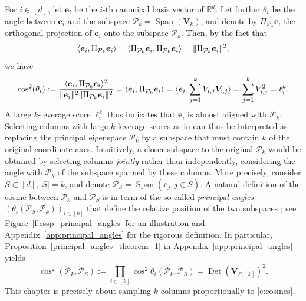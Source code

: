 \documentclass[twoside,11pt]{book}
\newcommand{\rev}[1]{\textcolor{black}{#1}}
\numberwithin{theorem}{chapter}
\numberwithin{definition}{chapter}
\numberwithin{proposition}{chapter}
\numberwithin{corollary}{chapter}
\numberwithin{example}{chapter}
\numberwithin{lemma}{chapter}
\numberwithin{assumption}{chapter}
\numberwithin{equation}{chapter}
\numberwithin{figure}{chapter}
\DeclareMathOperator{\Det}{Det}
\DeclareMathOperator{\Span}{\mathrm{Span}}
\begin{document}
For $i \in [d]$, let $\bm{e}_{i}$ be the $i$-th canonical basis vector of $\mathbb{R}^{d}$. Let further $\theta_{i}$ be the angle between $\bm{e}_{i}$ and the subspace $\mathcal{P}_{k} = \Span(\bm{V}_{k})$, and denote by $\Pi_{\mathcal{P}_{k}}\bm{e}_{i}$ the orthogonal projection of $\bm{e}_{i}$ onto the subspace $\mathcal{P}_{k}$. Then, \rev{by the fact that}
\begin{equation}
\rev{\langle \bm{e}_{i},\Pi_{\mathcal{P}_{k}}\bm{e}_{i} \rangle = \langle \Pi_{\mathcal{P}_{k}}\bm{e}_{i},\Pi_{\mathcal{P}_{k}}\bm{e}_{i}\rangle = \|\Pi_{\mathcal{P}_{k}}\bm{e}_{i}\|^{2}},
\end{equation}
\rev{we have}
\begin{equation}
\cos^{2}(\theta_{i}) := \rev{\frac{\langle \bm{e}_{i},\Pi_{\mathcal{P}_{k}}\bm{e}_{i}\rangle^2}{\Vert\bm{e}_{i}\Vert^2 \Vert \Pi_{\mathcal{P}_{k}}\bm{e}_{i}\Vert^2}} = \langle \bm{e}_{i},\Pi_{\mathcal{P}_{k}}\bm{e}_{i}\rangle = \langle \bm{e}_{i}, \sum\limits_{j =1}^{k} V_{i,j}\bm{V}_{:,j}\rangle = \sum\limits_{j =1}^{k} V_{i,j}^{2} = \ell^{k}_{i}.
\end{equation}
A large $k$-leverage score $\ell_i^k$ thus indicates that $\bm{e}_i$ is almost aligned with $\mathcal{P}_{k}$. Selecting columns with large $k$-leverage scores as in \cite{DrMaMu07} can thus be interpreted as replacing the principal eigenspace $\mathcal{P}_k$ by a subspace that must contain $k$ of the original coordinate axes. Intuitively, a closer subspace to the original $\mathcal{P}_k$ would be obtained by selecting columns \emph{jointly} rather than independently, considering the angle with $\mathcal{P}_k$ of the subspace spanned by these columns. More precisely, consider $S \subset [d], |S| = k$, and denote $\mathcal{P}_{S} = \Span(\bm{e}_{j}, j \in S)$. A natural definition of the cosine between $\mathcal{P}_{k}$ and $\mathcal{P}_{S}$ is in term of the so-called \emph{principal angles} $(\theta_{i}(\mathcal{P}_{S},\mathcal{P}_{k}))_{i \in [k]}$ that define the relative position of the two subspaces \cite[Section 6.4.4]{GoVa96}; see Figure~\ref{f:cssp_principal_angles} for an illustration and Appendix~\ref{app:principal_angles} for the rigorous definition. In particular, Proposition~\ref{principal_angles_theorem_1} in Appendix~\ref{app:principal_angles} yields
\begin{equation}
\cos^{2}(\mathcal{P}_{k},\mathcal{P}_{S}):= \prod\limits_{i \in [k]}\cos^{2} \theta_{i} (\mathcal{P}_{k},\mathcal{P}_{S}) = \Det(\bm{V}_{S,[k]})^{2}.
\label{e:cosines}
\end{equation}
This chapter is precisely about sampling $k$ columns proportionally to \eqref{e:cosines}.
\end{document}
